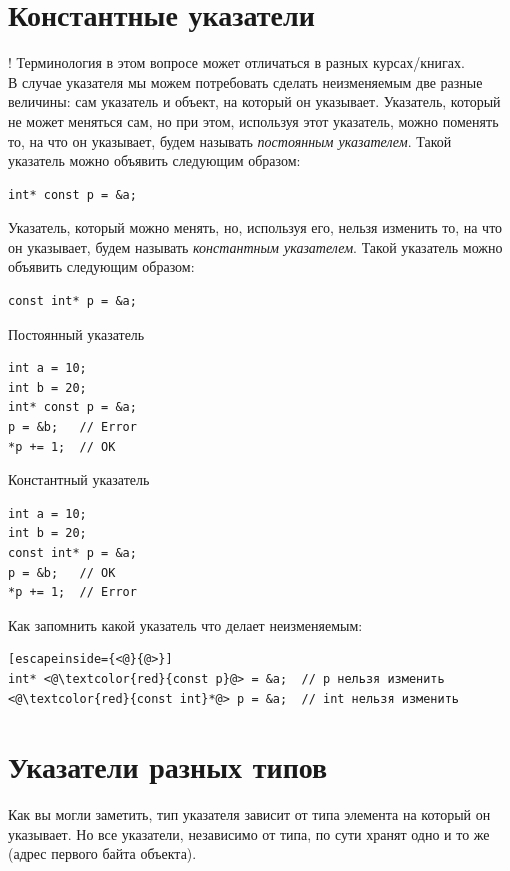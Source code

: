 \documentclass[10pt]{article}
\begin{document}
\newpage
\section*{Константные указатели}
! Терминология в этом вопросе может отличаться в разных курсах/книгах.\\

В случае указателя мы можем потребовать сделать неизменяемым две разные величины: сам указатель и объект, на который он указывает. 
Указатель, который не может меняться сам, но при этом, используя этот указатель, можно поменять то, на что он указывает, будем называть \textit{постоянным указателем}. Такой указатель можно объявить следующим образом:
\begin{lstlisting}
int* const p = &a;
\end{lstlisting}
Указатель, который можно менять, но, используя его, нельзя изменить то, на что он указывает, будем называть \textit{константным указателем}. Такой указатель можно объявить следующим образом:
\begin{lstlisting}
const int* p = &a;
\end{lstlisting}

\begin{multicols}{2}
Постоянный указатель
\begin{lstlisting}
int a = 10;
int b = 20;
int* const p = &a;
p = &b;   // Error
*p += 1;  // OK
\end{lstlisting}

Константный указатель
\begin{lstlisting}
int a = 10;
int b = 20;
const int* p = &a;
p = &b;   // OK
*p += 1;  // Error
\end{lstlisting}
\end{multicols}

\noindent Как запомнить какой указатель что делает неизменяемым:
\begin{lstlisting}[escapeinside={<@}{@>}]
int* <@\textcolor{red}{const p}@> = &a;  // p нельзя изменить
<@\textcolor{red}{const int}*@> p = &a;  // int нельзя изменить
\end{lstlisting}


\section*{Указатели разных типов}
Как вы могли заметить, тип указателя зависит от типа элемента на который он указывает. Но все указатели, независимо от типа, по сути хранят одно и то же (адрес первого байта объекта). 
\end{document}
